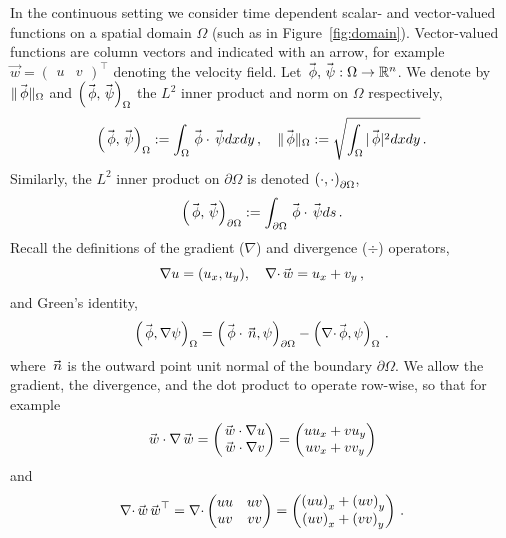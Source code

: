 In the continuous setting we consider time dependent scalar- and vector-valued functions on a spatial domain $\Omega$ (such as in Figure~\ref{fig:domain}). Vector-valued functions are column vectors and indicated with an arrow, for example
$
  \vec{w} =
  \begin{pmatrix}
    u & v
  \end{pmatrix}^\top
$
denoting the velocity field. Let $\phic, \psic : \Omega \to \mathbb{R}^n$. We denote by $\normc{\phic}$ and $\ipc{\phic}{\psic}$ the $L^2$ inner product and norm on $\Omega$ respectively,
\begin{equation*}
  \ipc{\phic}{\psic} := \int_\Omega \phic \cdot \psic dx dy \,, \quad \normc{\phic} := \sqrt{\int_\Omega |\phic|^2 dxdy} \,.
\end{equation*}
Similarly, the $L^2$ inner product on $\partial \Omega$ is denoted $\left(\cdot, \cdot\right)_{\partial \Omega}$,
\begin{equation*}
  \ipbc{\phic}{\psic} := \int_{\partial \Omega} \phic \cdot \psic ds \,.
\end{equation*}
Recall the definitions of the gradient ($\nabla$) and divergence ($\div$) operators,
\begin{equation*}
  \nabla u = (u_x, u_y), \quad \div\wc = u_x + v_y \,,
\end{equation*}
and Green's identity,
\begin{equation}
  \label{eq:greens_identity}
  \ipc{\phic}{\nabla\psi} = \ipbc{\phic \cdot \nc}{\psi} - \ipc{\div \phic}{\psi} \,.
\end{equation}
where $\nc$ is the outward point unit normal of the boundary $\partial \Omega$. We allow the gradient, the divergence, and the dot product to operate row-wise, so that for example
\begin{equation*}
  \wc \cdot \nabla \wc =
  \begin{pmatrix}
    \wc \cdot \nabla u \\
    \wc \cdot \nabla v
  \end{pmatrix}
  =
  \begin{pmatrix}
    u u_x + v u_y \\
    u v_x + v v_y
  \end{pmatrix}
\end{equation*}
and
\begin{equation*}
  \div \wc \wc^\top =
  \div
  \begin{pmatrix}
    uu & uv \\
    uv & vv
  \end{pmatrix}
  =
  \begin{pmatrix}
    {(uu)}_x + {(uv)}_y \\
    {(uv)}_x + {(vv)}_y
  \end{pmatrix} \,.
\end{equation*}

